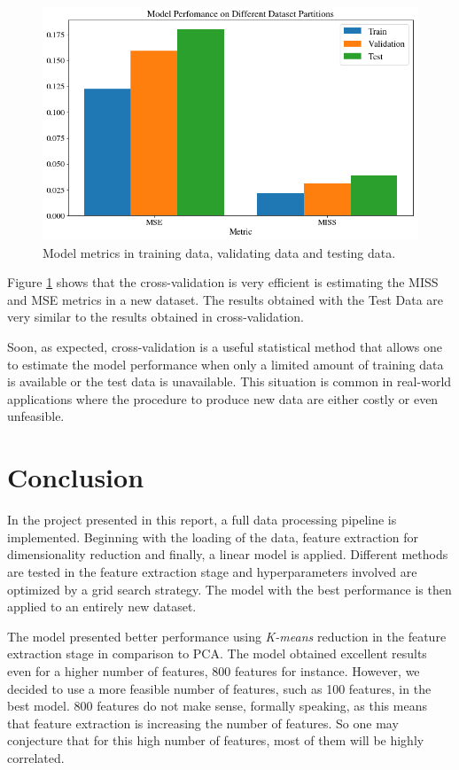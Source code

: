 \documentclass{article}
\begin{document}
\begin{figure}[h!]
    \centering
    \includegraphics[scale=0.42]{images/metrics_comparison.png}
    \caption{Model metrics in training data, validating data and testing data.}
    \label{fig:metrics_comparison}
\end{figure}

Figure \ref{fig:metrics_comparison} shows that the cross-validation is very efficient is estimating the MISS and MSE metrics in a new dataset. The results obtained with the Test Data are very similar to the results obtained in cross-validation.

Soon, as expected, cross-validation is a useful statistical method that allows one to estimate the model performance when only a limited amount of training data is available or the test data is unavailable. This situation is common in real-world applications where the procedure to produce new data are either costly or even unfeasible. 

\section{Conclusion}

In the project presented in this report, a full data processing pipeline is implemented. Beginning with the loading of the data, feature extraction for dimensionality reduction and finally, a linear model is applied. Different methods are tested in the feature extraction stage and hyperparameters involved are optimized by a grid search strategy. The model with the best performance is then applied to an entirely new dataset.

The model presented better performance using \textit{K-means} reduction in the feature extraction stage in comparison to PCA. The model obtained excellent results even for a higher number of features, 800 features for instance. However, we decided to use a more feasible number of features, such as 100 features, in the best model. 800 features do not make sense, formally speaking, as this means that feature extraction is increasing the number of features. So one may conjecture that for this high number of features, most of them will be highly correlated.
\end{document}
